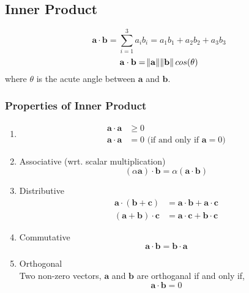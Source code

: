 \documentclass[11pt, oneside]{article}
\renewcommand{\vec}[1]{\mathbf{#1}}
\begin{document}
\subsection{Inner Product}
\begin{equation}
\vec{a} \cdot \vec{b}=\sum_{i=1}^3 a_ib_i = a_1b_1 + a_2b_2 + a_3b_3
\end{equation}
\begin{equation}
  \vec{a} \cdot \vec{b} = \norm{\vec{a}} \norm{\vec{b}} cos(\theta)
\end{equation}
where $\theta$ is the acute angle between $\vec{a}$ and $\vec{b}$.

\subsubsection{Properties of Inner Product}


\begin{enumerate}
  \item \begin{align}
    \vec{a}\cdot\vec{a}&\geq0\\
    \vec{a}\cdot\vec{a}&=0 \text{ (if and only if } \vec{a} = 0)
  \end{align}
  
  \item Associative (wrt. scalar multiplication)
  \begin{equation}
    (\alpha\vec{a})\cdot\vec{b} = \alpha(\vec{a}\cdot\vec{b})
  \end{equation}
  \item Distributive
  \begin{align}
    \vec{a}\cdot(\vec{b}+\vec{c}) &= \vec{a}\cdot\vec{b} + \vec{a}\cdot\vec{c}\\
    (\vec{a}+\vec{b})\cdot\vec{c} &= \vec{a}\cdot\vec{c} + \vec{b}\cdot\vec{c}
  \end{align}
  \item Commutative
  \begin{equation}
    \vec{a}\cdot\vec{b} = \vec{b}\cdot\vec{a}
  \end{equation}
  \item Orthogonal\\
  Two non-zero vectors, $\vec{a}$ and $\vec{b}$ are orthoganal if and only if,
  \begin{equation}
    \vec{a}\cdot\vec{b} = 0
  \end{equation}
\end{enumerate} 
\end{document}
